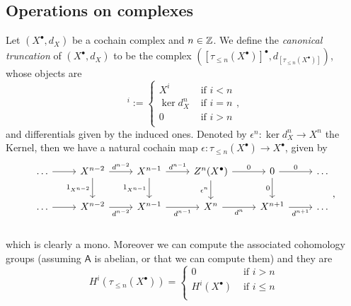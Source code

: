 \subsection{Operations on complexes}
\begin{defn}
	Let $\left( X^{\bullet}, d_{X} \right)$ be a cochain complex and $n \in \mathbb{Z}$.
	We define the {\em canonical truncation} of $\left( X^{\bullet}, d_{X} \right)$ to be the complex
	$\left( [\tau_{\leq n}(X^\bullet)]^{\bullet}, d_{[\tau_{\leq n}(X^\bullet)]} \right)$, whose objects are
	\begin{equation}
		[\tau_{\leq n}(X^\bullet)]^i := 
	\begin{cases}
		X^i & \text{ if } i < n\\
		\ker d_X^n & \text{ if } i = n\\
		0 & \text{ if } i > n\\
	\end{cases} 
	,\end{equation} 
	and differentials given by the induced ones.
	Denoted by $\epsilon^n: \ker d^n_X \to X^n$ the Kernel, then we have a
	natural cochain map $\epsilon: \tau_{\leq n}(X^\bullet) \to X^\bullet$, given by
	\begin{equation}
	\begin{tikzcd}
		\ldots \arrow[r, "", rightarrow] &
		X^{n-2} \arrow[r, "d^{n-2}", rightarrow] \arrow[d, "1_{X^{n-2}}"', rightarrow] &
		X^{n-1} \arrow[r, "d^{n-1}", rightarrow] \arrow[d, "1_{X^{n-1}}"', rightarrow] &
		Z^{n}(X^\bullet) \arrow[r, "0", rightarrow] \arrow[d, "\epsilon^{n}"', rightarrow] &
		0 \arrow[r, "0", rightarrow] \arrow[d, "0"', rightarrow] &
		\ldots \\
		\ldots \arrow[r, "", rightarrow] &
		X^{n-2} \arrow[r, "d^{n-2}"', rightarrow] &
		X^{n-1} \arrow[r, "d^{n-1}"', rightarrow] &
		X^{n} \arrow[r, "d^{n}"', rightarrow] &
		X^{n+1} \arrow[r, "d^{n+1}"', rightarrow] &
		\ldots \\
	\end{tikzcd}
	,\end{equation} 
	which is clearly a mono.
	Moreover we can compute the associated cohomology groups
	(assuming $\mathsf{A}$ is abelian, or that we can compute them)
	and they are
	\begin{equation}
		H^i \left( \tau_{\leq n}(X^\bullet) \right) =
		\begin{cases}
			0 & \text{ if } i > n\\
			H^i(X^\bullet) & \text{ if } i \leq n\\
		\end{cases} 

\end{equation}
\end{defn}
